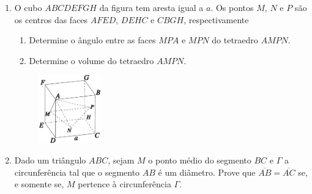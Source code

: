 \documentclass[a4paper,5pt]{amsbook}
\begin{document}
\begin{enumerate}
    \item O cubo $ABCDEFGH$ da figura tem aresta igual a $a$. Os pontos $M$,
        $N$ e $P$ s\~ao os centros das faces $AFED$, $DEHC$ e $CBGH$,
        respectivamente
        \begin{enumerate}
            \vspace{0.3cm}
            \item Determine o \^angulo entre as faces $MPA$ e $MPN$ do tetraedro
                $AMPN$.
            \vspace{0.3cm}
            \item Determine o volume do tetraedro $AMPN$.
        \end{enumerate}
        \begin{figure}[!h]
            \centering
            \includegraphics[width=0.25\textwidth]{fig02-3.pdf}
        \end{figure}

    \vspace{0.5cm}
    \item Dado um tri\^angulo $ABC$, sejam $M$ o ponto m\'edio do segmento $BC$ e
        $\Gamma$ a circunfer\^encia tal que o segmento $AB$ \'e um di\^ametro. Prove
        que $\overline{AB} = \overline{AC}$ se, e somente se, $M$ pertence \`a
        circunfer\^encia $\Gamma$.


\end{enumerate}
\end{document}

